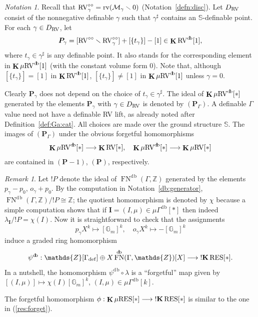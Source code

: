 \documentclass[12pt]{amsart}
\theoremstyle{plain}
\theoremstyle{definition}
\theoremstyle{remark}
\newtheorem{rem}[thm]{Remark}
\newtheorem{nota}[thm]{Notation}
\numberwithin{equation}{section}
\theoremstyle{plain}
\newcommand{\RV}{\textup{RV}}
\newcommand{\MM}{\mdl M}
\newcommand{\Z}{\mathds{Z}}
\newcommand{\G}{\mathds{G}}
\newcommand{\0}{\emptyset}
\newcommand{\mdl}[1]{\mathcal{#1}}  %
\newcommand{\fun}{\longrightarrow}
\newcommand{\efun}{\longmapsto}
\newcommand{\mi}{\smallsetminus}
\newcommand{\mRV}{{\mu}{\RV}}
\newcommand{\mgRV}{{\mu}{\RV}}
\newcommand{\mG}{{\mu}{\Gamma}}
\newcommand{\RES}{\textup{RES}}
\newcommand{\mgRES}{{\mu}{\RES}}
\DeclareMathOperator{\rv}{rv}
\DeclareMathOperator{\ggk}{\mathbf{K}}
\DeclareMathOperator{\sggk}{!\mathbf{K}}
\DeclareMathOperator{\fn}{FN}
\DeclareMathOperator{\db}{d \! b}
\newcommand{\ccirc}{\circ \circ}
\begin{document}
\begin{nota}\label{pgammabis}
Recall that $\RV^{\ccirc}_\gamma = \rv(\MM_{\gamma} \mi 0)$ (Notation~\ref{defn:disc}). Let $D_{\RV}$ consist of the nonnegative definable $\gamma$ such that $\gamma^\sharp$ contains an $\mathbb S$-definable point. For each $\gamma\in D_{\RV}$, let
\[
\bm P_\gamma = [\RV^{\ccirc} \mi \RV^{\ccirc}_{\gamma}] + [\{t_\gamma\}] - [1] \in \ggk \RV^{\db}[1],
\]
where $t_\gamma \in \gamma^\sharp$ is any definable point.  It also stands for the corresponding element  in $\ggk \mRV^{\db}[1]$ (with the constant volume form $0$). Note that, although $[\{t_\gamma\}] = [1]$ in $\ggk \RV^{\db}[1]$,  $[\{t_\gamma\}] \neq [1]$ in $\ggk \mRV^{\db}[1]$  unless $\gamma = 0$.


Clearly  $\bm P_\gamma$ does not depend on the choice of $t_\gamma \in \gamma^\sharp$. The ideal of $\ggk \mRV^{\db}[*]$   generated by the elements $\bm P_\gamma$ with $\gamma\in D_{\RV}$ is denoted by $(\bm P_\Gamma)$. A definable $\Gamma$ value need not have a definable RV lift, as already noted after Definition~\ref{def:Ga:cat}. All choices are made over the ground structure $\mathbb S$. The images of $(\bm P_\Gamma)$ under the obvious forgetful homomorphisms
\[
\ggk  \mgRV^{\db}[*] \fun \ggk \RV[*], \quad \ggk  \mgRV^{\db}[*] \fun \ggk  \mgRV[*]
\]
are contained in $(\bm P - 1)$, $(\bm P)$, respectively.
\end{nota}

\begin{rem}\label{db:gam:res}
Let $!P$ denote the ideal of $\fn^{\db}(\Gamma, \Z)$ generated by the elements $p_\gamma - p_0$, $o_\gamma + p_0$. By the computation in Notation~\ref{db:generator}, $\fn^{\db}(\Gamma, \Z) / !P \cong \Z$; the quotient homomorphism is denoted by $\chi$ because a simple computation shows that if $\bm I = (I, \mu) \in \mG^{\db}[*]$ then indeed $\lambda_{\bm I} / !P = \chi(I)$. Now it is straightforward to check that the assignments
\begin{equation}\label{Gam:ass:bd}
p_\gamma X^k \efun  [\G_m]^{k}, \quad o_\gamma X^k \efun  - [\G_m]^{k}
\end{equation}
induce a graded ring homomorphism
\[
\psi^{\db} : \Z[\Gamma_{\mathrm{def}}] \oplus X\fn^{\db}(\Gamma, \Z)[X] \fun \sggk \RES[*].
\]
In a nutshell, the  homomorphism $\psi^{\db} \circ \lambda$ is a ``forgetful'' map  given by $[(I, \mu)] \efun \chi(I)[\G_m]^{k}$, $(I, \mu) \in \mG^{\db}[k]$.
\end{rem}


The forgetful homomorphism $\phi : \ggk \mgRES[*] \fun \sggk \RES[*]$ is similar to the one in  (\ref{res:forget}).
\end{document}
